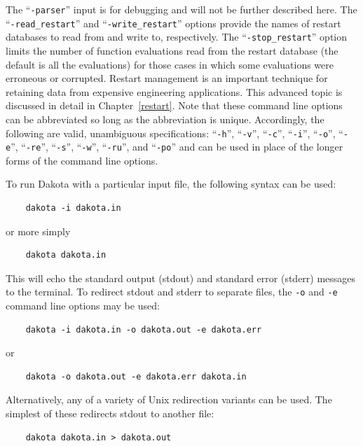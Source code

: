 The ``\texttt{-parser}'' input is for debugging and will not
be further described here. The ``\texttt{-read\_restart}''
and ``\texttt{-write\_restart}'' options provide the names of
restart databases to read from and write to, respectively. The
``\texttt{-stop\_restart}'' option limits the number of
function evaluations read from the restart database (the default is all
the evaluations) for those cases in which some evaluations were erroneous
or corrupted. Restart management is an important technique for retaining
data from expensive engineering applications. This advanced topic is
discussed in detail in Chapter~\ref{restart}. Note that these command
line options can be abbreviated so long as the abbreviation is unique.
Accordingly, the following are valid, unambiguous specifications: ``\texttt{-h}'',
``\texttt{-v}'', ``\texttt{-c}'', ``\texttt{-i}'', ``\texttt{-o}'',
``\texttt{-e}'', ``\texttt{-re}'', ``\texttt{-s}'', ``\texttt{-w}'',
``\texttt{-ru}'', and ``\texttt{-po}'' and can be used
in place of the longer forms of the command line options.

To run Dakota with a particular input file, the following syntax can
be used:
\begin{small}
\begin{verbatim}
    dakota -i dakota.in
\end{verbatim}
\end{small}
or more simply
\begin{small}
\begin{verbatim}
    dakota dakota.in
\end{verbatim}
\end{small}

This will echo the standard output (stdout) and standard error
(stderr) messages to the terminal. To redirect stdout and stderr to
separate files, the \texttt{-o} and \texttt{-e} command line options
may be used:
\begin{small}
\begin{verbatim}
    dakota -i dakota.in -o dakota.out -e dakota.err
\end{verbatim}
\end{small}
or
\begin{small}
\begin{verbatim}
    dakota -o dakota.out -e dakota.err dakota.in
\end{verbatim}
\end{small}

Alternatively, any of a variety of Unix redirection variants can be
used. The simplest of these redirects stdout to another file:
\begin{small}
\begin{verbatim}
    dakota dakota.in > dakota.out
\end{verbatim}
\end{small}

